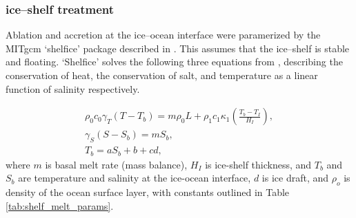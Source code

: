 
\subsubsection{ice--shelf treatment} \label{sec:ice_shelf_mb}

Ablation and accretion at the ice--ocean interface were paramerized by the MITgcm `shelfice' package described in \citep{losch2008modeling}. This assumes that the ice--shelf is stable and floating. `Shelfice' solves the following three equations from \cite{hellmer1989two}, describing the conservation of heat, the conservation of salt, and temperature as a linear function of salinity respectively.

\begin{align}
    \rho_0 c_0 \gamma_T ( T - T_b) = m \rho_0 L + \rho_1 c_1 \kappa_1 \left( \frac{T_b - T_I}{H_I} \right), \label{eq:melt}\\
    \gamma_S \left( S- S_b \right) = m S_b, \\
    T_b = a S_b + b + c d,
\end{align}
where $m$ is basal melt rate (mass balance), $H_I$ is ice-shelf thickness, and $T_b$ and $S_b$ are temperature and salinity at the ice-ocean interface, $d$ is ice draft, and $\rho_o$ is density of the ocean surface layer, with constants outlined in Table \ref{tab:shelf_melt_params}. 
 
